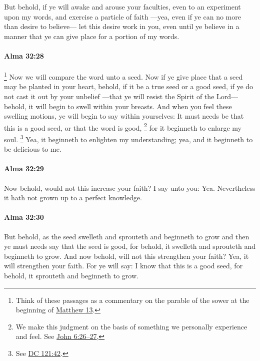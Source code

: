 			But behold, if ye will awake and arouse your faculties,
			even to an experiment upon my words,
			and exercise a particle of faith
			---yea, even if ye can no more than desire to believe---
			let this desire work in you, even until ye believe in a manner
			that ye can give place for a portion of my words.

		\paragraph{Alma 32:28} %
			\label{ALMA-32-28}

				\footnote{%
					Think of these passages as a commentary on the parable of the sower at the beginning of \hyperref[MATTHEW-13]{Matthew 13}.
					}%
			Now we will compare the word unto a seed.
			Now if ye give place that a seed may be planted in your heart,
			behold, if it be a true seed or a good seed,
			if ye do not cast it out by your unbelief
			---that ye will resist the Spirit of the Lord---
			behold, it will begin to swell within your breasts.
			And when you feel these swelling motions,
			ye will begin to say within yourselves:
			It must needs be that this is a good seed, or that the word is good,
				\footnote{%
					We make this judgment on the basis of something we personally experience and feel. See \hyperref[JOHN-6-26]{John 6:26--27}, 
					}%
			for it beginneth to enlarge my soul.%
				\footnote{%
					See \hyperref[DC121-42]{DC 121:42}.
					}
			Yea, it beginneth to enlighten my understanding;
			yea, and it beginneth to be delicious to me.

		\paragraph{Alma 32:29} %
			\label{ALMA-32-29}

			Now behold, would not this increase your faith?
			I say unto you: Yea.
			Nevertheless it hath not grown up to a perfect knowledge.

		\paragraph{Alma 32:30} %
			\label{ALMA-32-30}

			But behold, as the seed swelleth and sprouteth and beginneth to grow
			and then ye must needs say that the seed is good,
			for behold, it swelleth and sprouteth and beginneth to grow.
			And now behold, will not this strengthen your faith?
			Yea, it will strengthen your faith.
			For ye will say:
			I know that this is a good seed,
			for behold, it sprouteth and beginneth to grow.

